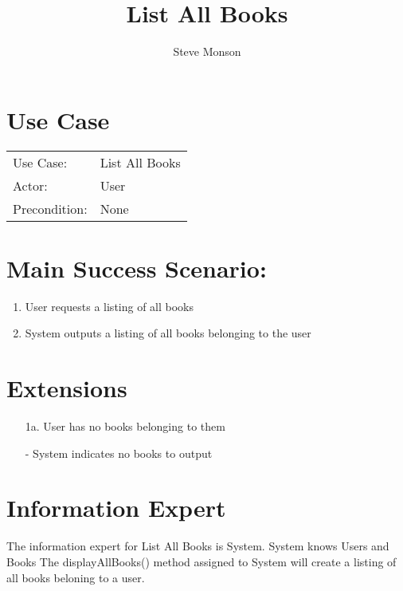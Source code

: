 \documentclass{article}
\title{List All Books}
\author{Steve Monson}
\begin{document}
\maketitle

\section*{Use Case}

\begin{tabular}{l l}
Use Case:     & List All Books \\
Actor:        & User \\
Precondition: & None \\
\end{tabular}

\section*{Main Success Scenario:}

\begin{enumerate}
    \item User requests a listing of all books
    \item System outputs a listing of all books belonging to the user
\end{enumerate}

\section*{Extensions}

\begin{itemize}
    \item [1a.] User has no books belonging to them
       
    - System indicates no books to output
\end{itemize}

\section*{Information Expert}

The information expert for List All Books is System.
System knows Users and Books
The displayAllBooks() method assigned to System will create a listing of all books beloning to a user.

\pagebreak
\end{document}
